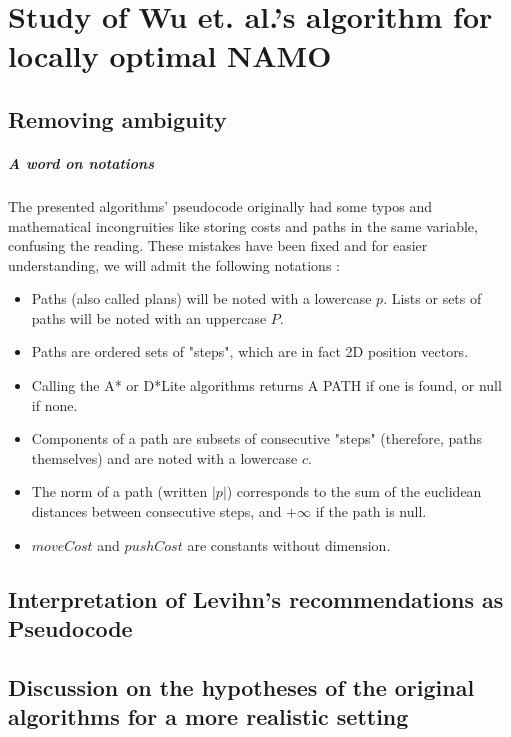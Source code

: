 
\chapter{Study of Wu et. al.'s algorithm for locally optimal NAMO} %

\label{Chapter3} %

\section{Removing ambiguity}

\paragraph{A word on notations} The presented algorithms' pseudocode originally had some typos and mathematical incongruities like storing costs and paths in the same variable, confusing the reading. These mistakes have been fixed and for easier understanding, we will admit the following notations :

\begin{itemize}
  \item Paths (also called plans) will be noted with a lowercase $p$. Lists or sets of paths will be noted with an uppercase $P$.
  \item Paths are ordered sets of "steps", which are in fact 2D position vectors.
  \item Calling the A* or D*Lite algorithms returns A PATH if one is found, or null if none.
  \item Components of a path are subsets of consecutive "steps" (therefore, paths themselves) and are noted with a lowercase $c$.
  \item The norm of a path (written $|p|$) corresponds to the sum of the euclidean distances between consecutive steps, and $+\infty$ if the path is null.
  \item $moveCost$ and $pushCost$ are constants without dimension.
\end{itemize}

\section{Interpretation of Levihn's recommendations as Pseudocode}

\section{Discussion on the hypotheses of the original algorithms for a more realistic setting}
